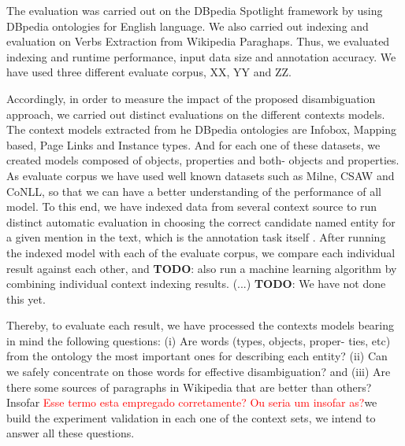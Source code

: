 \documentclass[10pt,a4paper]{article}
\newcommand{\todo}[1]{{\color{red}\textsf{\textbf{TODO}}: #1}}
\begin{document}
The evaluation was carried out on the DBpedia Spotlight framework by using DBpedia ontologies for English language. We also carried out indexing and evaluation on Verbs Extraction from Wikipedia Paraghaps. Thus, we evaluated indexing and runtime performance, input data size and annotation accuracy. We have used three different evaluate corpus, XX, YY and ZZ.

Accordingly, in order to measure the impact of the proposed disambiguation approach, we carried out distinct evaluations on the different contexts models. The context models extracted from he DBpedia ontologies are Infobox, Mapping based, Page Links and Instance types. And for each one of these datasets, we created models composed of objects, properties and both- objects and properties. As evaluate corpus we have used well known datasets such as Milne, CSAW and CoNLL, so that we can have a better understanding of the performance of all model.
To this end, we have indexed data from several context source to run distinct automatic evaluation in choosing the correct candidate named entity for a given mention in the text, which is the annotation task itself . After running the indexed model with each of the evaluate corpus, we compare each individual result against each other, and \todo{also run a machine learning algorithm by combining individual context indexing results. (...)} \todo{ We have not done this yet.}

Thereby, to evaluate each result, we have processed the contexts models bearing in mind the following questions: (i) Are words (types, objects, proper- ties, etc) from the ontology the most important ones for describing each entity? (ii) Can we safely concentrate on those words for effective disambiguation? and (iii) Are there some sources of paragraphs in Wikipedia that are better than others?
Insofar \textcolor{red}{Esse termo esta empregado corretamente? Ou seria um insofar as?}we build the experiment validation in each one of the context sets, we intend to answer all these questions.




\end{document}
